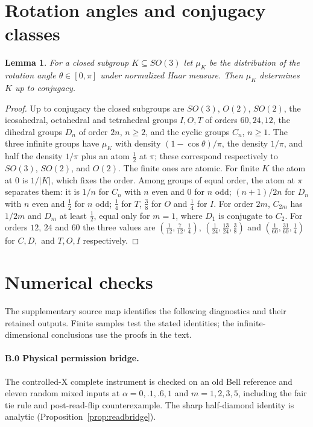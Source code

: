 \documentclass[12pt]{article}
\newtheorem{lemma}[theorem]{Lemma}
\theoremstyle{definition}
\theoremstyle{remark}
\begin{document}
\appendix

\section{Rotation angles and conjugacy classes}\label{app:angles}

\begin{lemma}\label{lem:angles}
For a closed subgroup \(K\subseteq SO(3)\) let \(\mu_K\) be the distribution of the
rotation angle \(\theta\in[0,\pi]\) under normalized Haar measure. Then \(\mu_K\)
determines \(K\) up to conjugacy.
\end{lemma}

\begin{proof}
Up to conjugacy the closed subgroups are \(SO(3)\), \(O(2)\), \(SO(2)\), the
icosahedral, octahedral and tetrahedral groups \(I,O,T\) of orders \(60,24,12\), the
dihedral groups \(D_n\) of order \(2n\), \(n\ge2\), and the cyclic groups \(C_n\),
\(n\ge1\). The three infinite groups have \(\mu_K\) with density
\((1-\cos\theta)/\pi\), the density \(1/\pi\), and half the density \(1/\pi\) plus an
atom \(\frac12\) at \(\pi\); these correspond respectively to \(SO(3)\),
\(SO(2)\), and \(O(2)\). The finite ones are atomic. For finite \(K\) the atom at
\(0\) is \(1/|K|\), which fixes the order. Among groups of equal order, the atom at
\(\pi\) separates them: it is \(1/n\) for \(C_n\) with \(n\) even and \(0\) for \(n\)
odd; \((n+1)/2n\) for \(D_n\) with \(n\) even and \(\frac12\) for \(n\) odd; \(\frac14\)
for \(T\), \(\frac38\) for \(O\) and \(\frac14\) for \(I\). For order \(2m\), \(C_{2m}\)
has \(1/2m\) and \(D_m\) at least \(\frac12\), equal only for \(m=1\), where
\(D_1\) is conjugate to \(C_2\). For orders \(12\), \(24\) and \(60\) the three values
are \((\frac1{12},\frac7{12},\frac14)\), \((\frac1{24},\frac{13}{24},\frac38)\) and
\((\frac1{60},\frac{31}{60},\frac14)\) for \(C,D,\) and \(T,O,I\) respectively.
\end{proof}

\section{Numerical checks}\label{app:checks}

The supplementary source map identifies the following diagnostics
and their retained outputs. Finite samples test the stated identities;
the infinite-dimensional conclusions use the proofs in the text.

\paragraph{B.0 Physical permission bridge.}
The controlled-X complete instrument is checked on an old Bell reference
and eleven random mixed inputs at $\alpha=0,.1,.6,1$ and $m=1,2,3,5$,
including the fair tie rule and post-read-flip counterexample.
The sharp half-diamond identity is analytic
(Proposition~\ref{prop:readbridge}).
\end{document}
